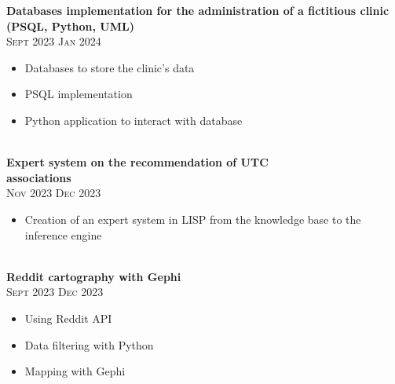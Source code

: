 \documentclass[oneside]{article}
\begin{document}
{\begin{minipage}[t][\dimexpr\textheight-2\fboxrule-2\fboxsep\relax][t]{\dimexpr0.6\textwidth-2\fboxrule-2\fboxsep\relax}
        {\large \textbf{Databases implementation for the administration of a fictitious clinic (PSQL, Python, UML)}} \\
        {\scshape{}\selectfont\footnotesize Sept 2023 \textendash{} Jan 2024} \\
        \vspace{-\baselineskip}
        \vspace{0.2cm}
        \begin{itemize}
            \setlength{\itemsep}{-5pt}
            \item Databases to store the clinic’s data
            \item PSQL implementation
            \item Python application to interact  with database
        \end{itemize}\\

        {\large \textbf{Expert system on the recommendation of UTC \\ associations}} \\
        {\scshape{}\selectfont\footnotesize Nov 2023 \textendash{} Dec 2023} \\
        \vspace{-\baselineskip}
        \vspace{0.2cm}
        \begin{itemize}
            \setlength{\itemsep}{-5pt}
            \item Creation of an expert system in LISP from the knowledge base to the inference engine
        \end{itemize}\\
        
        {\large \textbf{Reddit cartography with Gephi}} \\
        {\scshape{}\selectfont\footnotesize Sept 2023 \textendash{} Dec 2023} \\
        \vspace{-\baselineskip}
        \vspace{0.2cm}
        \begin{itemize}
            \setlength{\itemsep}{-5pt}
            \item Using Reddit API
            \item Data filtering with Python
            \item Mapping with Gephi
        \end{itemize}\\


\end{minipage}}
\end{document}
